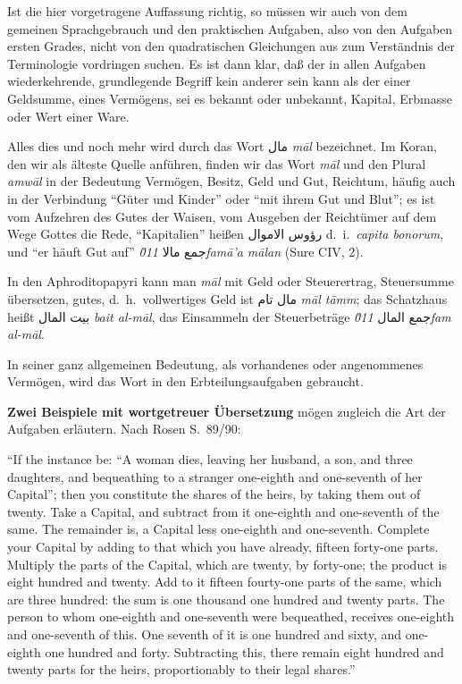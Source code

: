 \documentclass[11pt,a4paper]{article}
\newcommand{\RL}[1]{\beginR#1\endR}
\newcommand{\ar}[1]{{\arabicfont\RL{#1}}}
\newcommand{\enquote}[1]{``#1''}
\begin{document}
Ist die hier vorgetragene Auffassung richtig, so m\"ussen wir auch von dem gemeinen Sprachgebrauch und den praktischen Aufgaben, also von den Aufgaben ersten Grades, nicht von den quadratischen Gleichungen aus zum Verst\"andnis der Terminologie vordringen suchen. Es ist dann klar, da\ss{} der in allen Aufgaben wiederkehrende, grundlegende Begriff kein anderer sein kann als der einer Geldsumme, eines Verm\"ogens, sei es bekannt oder unbekannt, Kapital, Erbmasse oder Wert einer Ware.

Alles dies und noch mehr wird durch das Wort \ar{مال} \textit{m\=al} bezeichnet. Im Koran, den wir als \"alteste Quelle anf\"uhren, finden wir das Wort \textit{m\=al} und den Plural \textit{amw\=al} in der Bedeutung Verm\"ogen, Besitz, Geld und Gut, Reichtum, h\"aufig auch in der Verbindung \enquote{G\"uter und Kinder} oder \enquote{mit ihrem Gut und Blut}; es ist vom Aufzehren des Gutes der Waisen, vom Ausgeben der Reicht\"umer auf dem Wege Gottes die Rede, \enquote{Kapitalien} hei\ss{}en \ar{رؤوس الاموال} d.\ i.\ \textit{capita bonorum}, und \enquote{er h\"auft Gut auf} \ar{جمع مالا} \textit{\u011fam\=a'a m\=alan} (Sure CIV, 2).

In den Aphroditopapyri kann man \textit{m\=al} mit Geld oder Steuerertrag, Steuersumme \"ubersetzen, gutes, d.\ h.\ vollwertiges Geld ist \ar{مال تام} \textit{m\=al t\=amm}; das Schatzhaus hei\ss{}t \ar{بيت المال} \textit{bait al-m\=al}, das Einsammeln der Steuerbetr\"age \ar{جمع المال} \textit{\u011fam al-m\=al}.

In seiner ganz allgemeinen Bedeutung, als vorhandenes oder angenommenes Verm\"ogen, wird das Wort in den Erbteilungsaufgaben gebraucht.

\textbf{Zwei Beispiele mit wortgetreuer \"Ubersetzung} m\"ogen zugleich die Art der Aufgaben erl\"autern. Nach Rosen S.\ 89/90:

\enquote{If the instance be: \enquote{A woman dies, leaving her husband, a son, and three daughters, and bequeathing to a stranger one-eighth and one-seventh of her Capital}; then you constitute the shares of the heirs, by taking them out of twenty. Take a Capital, and subtract from it one-eighth and one-seventh of the same. The remainder is, a Capital less one-eighth and one-seventh. Complete your Capital by adding to that which you have already, fifteen forty-one parts. Multiply the parts of the Capital, which are twenty, by forty-one; the product is eight hundred and twenty. Add to it fifteen fourty-one parts of the same, which are three hundred: the sum is one thousand one hundred and twenty parts. The person to whom one-eighth and one-seventh were bequeathed, receives one-eighth and one-seventh of this. One seventh of it is one hundred and sixty, and one-eighth one hundred and forty. Subtracting this, there remain eight hundred and twenty parts for the heirs, proportionably to their legal shares.}
\end{document}
